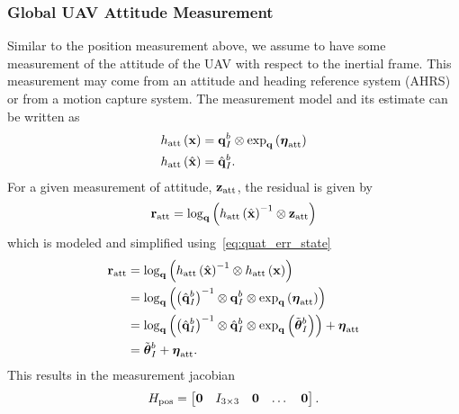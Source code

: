 \subsubsection{Global UAV Attitude Measurement}
Similar to the position measurement above, we assume to have some measurement of
the attitude of the UAV with respect to the inertial frame. This measurement may
come from an attitude and heading reference system (AHRS) or from a motion
capture system. 
The measurement model and its estimate can
be written as
\begin{align}
  h_{\text{att}} \left( \boldsymbol{\mathrm{x}} \right) &= \boldsymbol{\mathrm{q}}_{I}^b \otimes \exp_{\boldsymbol{\mathrm{q}}} \left(
  \boldsymbol{\mathrm{\eta}}_{\text{att}} \right) \\
    h_{\text{att}} \left( \hat{\boldsymbol{\mathrm{x}}} \right) &= \hat{\boldsymbol{\mathrm{q}}}_{I}^b.
\end{align}
For a given measurement of attitude, $\boldsymbol{\mathrm{z}}_{\text{att}}$, the residual is
given by
\begin{equation*}
  \boldsymbol{\mathrm{r}}_{\text{att}} = \log_{\boldsymbol{\mathrm{q}}} \left(  h_{\text{att}} \left(
  \hat{\boldsymbol{\mathrm{x}}} \right)^{-1} \otimes \boldsymbol{\mathrm{z}}_{\text{att}} \right)
\end{equation*}
which is modeled and simplified using~\eqref{eq:quat_err_state}
\begin{align*}
  \boldsymbol{\mathrm{r}}_{\text{att}} &= \log_{\boldsymbol{\mathrm{q}}} \left(  h_{\text{att}} \left(
  \hat{\boldsymbol{\mathrm{x}}} \right)^{-1} \otimes h_{\text{att}} \left( \boldsymbol{\mathrm{x}} \right) \right) \\
                        &= \log_{\boldsymbol{\mathrm{q}}} \left(  \left(
  \hat{\boldsymbol{\mathrm{q}}}_{I}^b \right)^{-1} \otimes \boldsymbol{\mathrm{q}}_{I}^b \otimes \exp_{\boldsymbol{\mathrm{q}}} \left(
  \boldsymbol{\mathrm{\eta}}_{\text{att}} \right)\right) \\
                        &= \log_{\boldsymbol{\mathrm{q}}} \left(  \left(
                        \hat{\boldsymbol{\mathrm{q}}}_{I}^b \right)^{-1} \otimes
                        \hat{\boldsymbol{\mathrm{q}}}_{I}^b \otimes \exp_{\boldsymbol{\mathrm{q}}} \left(
                      \tilde{\boldsymbol{\mathrm{\theta}}}_I^b \right) \right)
                          + \boldsymbol{\mathrm{\eta}}_{\text{att}}  \\
                        &= \tilde{\boldsymbol{\mathrm{\theta}}}_I^b
                          + \boldsymbol{\mathrm{\eta}}_{\text{att}}. 
\end{align*}
This results in the measurement jacobian
\begin{equation*}
  H_{\text{pos}} =
  \begin{bmatrix}
    \boldsymbol{\mathrm{0}} & I_{3 \times 3} & \boldsymbol{\mathrm{0}} & \dots & \boldsymbol{\mathrm{0}}
  \end{bmatrix}.
\end{equation*}

